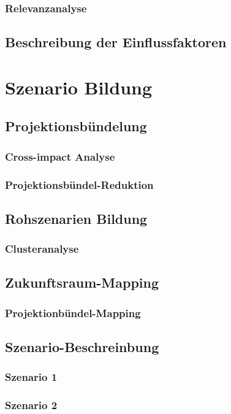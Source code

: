         \subsection{Relevanzanalyse}
    \section{Beschreibung der Einflussfaktoren}

\chapter{Szenario Bildung}
    \section{Projektionsbündelung}
        \subsection{Cross-impact Analyse}
        \subsection{Projektionsbündel-Reduktion}
    \section{Rohszenarien Bildung}
        \subsection{Clusteranalyse}
    \section{Zukunftsraum-Mapping}
        \subsection{Projektionbündel-Mapping}
    \section{Szenario-Beschreinbung}
        \subsection{Szenario 1}
        \subsection{Szenario 2}
        
